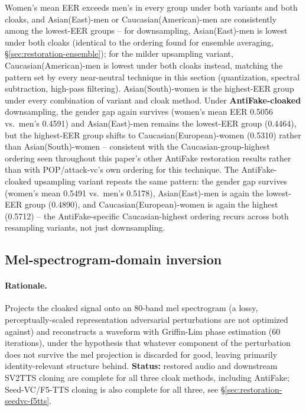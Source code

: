 \documentclass[11pt]{article}
\begin{document}
Women's mean EER exceeds men's in every group under both variants and
both cloaks, and Asian(East)-men or Caucasian(American)-men are
consistently among the lowest-EER groups -- for downsampling,
Asian(East)-men is lowest under both cloaks (identical to the ordering
found for ensemble averaging, \S\ref{sec:restoration-ensemble}); for
the milder upsampling variant, Caucasian(American)-men is lowest under
both cloaks instead, matching the pattern set by every near-neutral
technique in this section (quantization, spectral subtraction,
high-pass filtering). Asian(South)-women is the highest-EER group under
every combination of variant and cloak method. Under
\textbf{AntiFake-cloaked} downsampling, the gender gap again survives
(women's mean EER 0.5056 vs.\ men's 0.4591) and Asian(East)-men remains
the lowest-EER group (0.4464), but the highest-EER group shifts to
Caucasian(European)-women (0.5310) rather than Asian(South)-women --
consistent with the Caucasian-group-highest ordering seen throughout
this paper's other AntiFake restoration results rather than with
POP/attack-vc's own ordering for this technique. The AntiFake-cloaked
upsampling variant repeats the same pattern: the gender gap survives
(women's mean 0.5491 vs.\ men's 0.5178), Asian(East)-men is again the
lowest-EER group (0.4890), and Caucasian(European)-women is again the
highest (0.5712) -- the AntiFake-specific Caucasian-highest ordering
recurs across both resampling variants, not just downsampling.

\subsection{Mel-spectrogram-domain inversion}
\label{sec:restoration-mel}

\paragraph{Rationale.} Projects the cloaked signal onto an 80-band mel
spectrogram (a lossy, perceptually-scaled representation adversarial
perturbations are not optimized against) and reconstructs a waveform
with Griffin-Lim phase estimation (60 iterations), under the hypothesis
that whatever component of the perturbation does not survive the mel
projection is discarded for good, leaving primarily identity-relevant
structure behind. \textbf{Status:} restored audio and downstream SV2TTS
cloning are complete for all three cloak methods, including AntiFake;
Seed-VC/F5-TTS cloning is also complete for all three, see
\S\ref{sec:restoration-seedvc-f5tts}.
\end{document}
